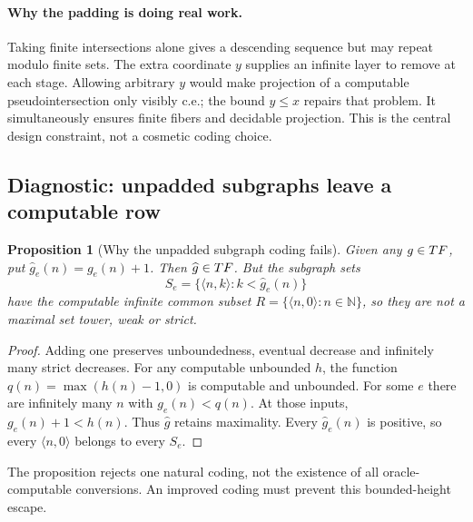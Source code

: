 \documentclass[11pt,a4paper]{article}
\newcommand{\N}{\mathbb N}
\newtheorem{proposition}[theorem]{Proposition}
\theoremstyle{definition}\newtheorem{definition}[theorem]{Definition}
\theoremstyle{remark}\newtheorem{remark}[theorem]{Remark}
\begin{document}
\paragraph{Why the padding is doing real work.}
Taking finite intersections alone gives a descending sequence but may repeat
modulo finite sets. The extra coordinate $y$ supplies an infinite layer to
remove at each stage. Allowing arbitrary $y$ would make projection of a
computable pseudointersection only visibly c.e.; the bound $y\leq x$ repairs
that problem. It simultaneously ensures finite fibers and decidable
projection. This is the central design constraint, not a cosmetic coding
choice.

\subsection{Diagnostic: unpadded subgraphs leave a computable row}
\begin{proposition}[Why the unpadded subgraph coding fails]
Given any $g\in TF$, put $\widehat g_e(n)=g_e(n)+1$. Then $\widehat g\in TF$. But the subgraph sets
\[
                 S_e=\{\langle n,k\rangle:k<\widehat g_e(n)\}
\]
have the computable infinite common subset $R=\{\langle n,0\rangle:n\in\N\}$, so they are not a maximal set tower, weak or strict.
\end{proposition}
\begin{proof}
Adding one preserves unboundedness, eventual decrease and infinitely many strict decreases. For any computable unbounded $h$, the function $q(n)=\max(h(n)-1,0)$ is computable and unbounded. For some $e$ there are infinitely many $n$ with $g_e(n)<q(n)$. At those inputs, $g_e(n)+1<h(n)$. Thus $\widehat g$ retains maximality. Every $\widehat g_e(n)$ is positive, so every $\langle n,0\rangle$ belongs to every $S_e$.
\end{proof}
The proposition rejects one natural coding, not the existence of all oracle-computable conversions. An improved coding must prevent this bounded-height escape.
\end{document}

